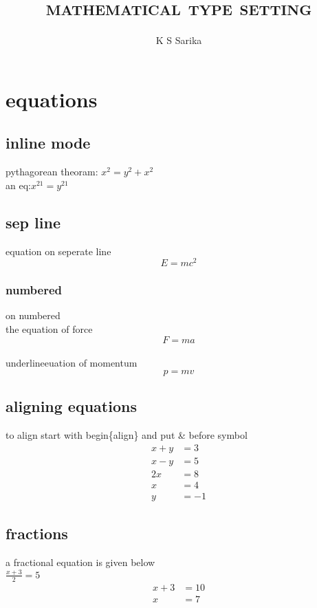 \documentclass[12pt]{book}
\begin{document}
	\title{ \textsc{mathematical type setting}}
	\author{K S Sarika}
	\date{ }
	\maketitle
	\pagestyle{empty}
	
	 \chapter{equations}
		\section*{inline mode}
			pythagorean theoram: $x^2 = y^2 + x^2 $\\
			an eq:$x^{21}=y^{21}$\\
		\section*{sep line} equation on seperate line$$ E=mc^2$$
		\subsection{numbered}on numbered\\ the equation of force \begin{equation}F=ma \end{equation} 
		\\underline{euation of momentum}
		\begin{equation}
		p=mv	
		\end{equation}	
		\section*{aligning equations}
		to align start with begin\{align\} and put \& before symbol
		\begin{align*}
			x+y &=3\\
			x-y &=5\\
			2x &=8\\x &=4\\y &=-1		
		\end{align*}	
		\section{fractions}
		a fractional equation is given below\\
		$\frac{x+3}{2}=5$
		\begin{align}
			x+3 &=10 \nonumber \\x &=7
		\end{align}
\end{document}
